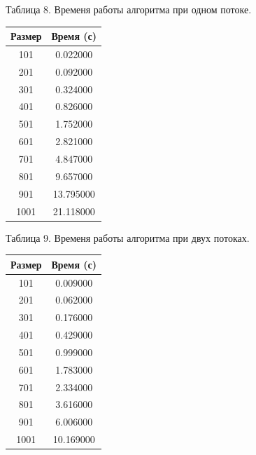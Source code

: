 \documentclass[12pt]{report}
\begin{document}
	\begin{minipage}{0.5\textwidth}
		\begin{center}
			Таблица 8. Временя работы алгоритма при одном потоке.
			
			\begin{tabular}{|c c|}
				\hline
				Размер & Время (с) \\
				\hline
				101 & 0.022000\\
				\hline
				201 & 0.092000\\
				\hline
				301 & 0.324000\\
				\hline
				401 & 0.826000\\
				\hline
				501 & 1.752000\\
				\hline
				601 & 2.821000\\
				\hline
				701 & 4.847000\\
				\hline
				801 & 9.657000\\
				\hline
				901 & 13.795000\\
				\hline
				1001 & 21.118000\\
				\hline
			\end{tabular}
		\end{center}
	\end{minipage}
	\hfill
	\begin{minipage}{0.5\textwidth}
		\begin{center}
			Таблица 9. Временя работы алгоритма при двух потоках.
			
			\begin{tabular}{|c c|}
				\hline
				Размер & Время (с) \\
				\hline
				101 & 0.009000\\
				\hline
				201 & 0.062000\\
				\hline
				301 & 0.176000\\
				\hline
				401 & 0.429000\\
				\hline
				501 & 0.999000\\
				\hline
				601 & 1.783000\\
				\hline
				701 & 2.334000\\
				\hline
				801 & 3.616000\\
				\hline
				901 & 6.006000\\
				\hline
				1001 & 10.169000\\
				\hline
			\end{tabular}
			
			
		\end{center}
	\end{minipage}
	
\end{document}
